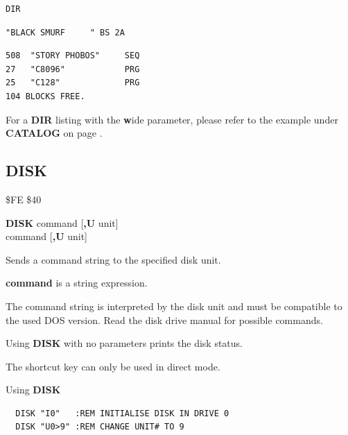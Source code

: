 \begin{description}[leftmargin=2cm,style=nextline]
\begin{tcolorbox}[colback=black,coltext=white]
\verbatimfont{\codefont}
\begin{verbatim}
DIR
\end{verbatim}
\selectfont{\codefont 0}
\begin{tcolorbox}[colback=white,coltext=black,arc=0mm,boxrule=0mm,
       left*=0.5mm,right*=0mm,top=0mm,bottom=0mm,nobeforeafter,
       left skip=0.5mm,
       width=28mm,height=3mm,valign=center]
\begin{verbatim}
"BLACK SMURF     " BS 2A
\end{verbatim}
\end{tcolorbox}
\begin{verbatim}
508  "STORY PHOBOS"     SEQ
27   "C8096"            PRG
25   "C128"             PRG
104 BLOCKS FREE.
\end{verbatim}
\end{tcolorbox}

For a {\bf DIR} listing with the {\bf w}ide parameter, please refer to the example under {\bf CATALOG}
on page \pageref{3columndirlisting}.

\end{description}


\newpage
\subsection{DISK}
\begin{description}[leftmargin=2cm,style=nextline]
\item [Token:] \$FE \$40
\item [Format:] {\bf DISK} command [{\bf,U} unit] \\
                 command [{\bf,U} unit]
\item [Usage:]

   Sends a command string to the specified disk unit.

   \unitdefinition

   {\bf command} is a string expression.

\item [Remarks:]
   The command string is interpreted by the disk unit
   and must be compatible to the used DOS version.
   Read the disk drive manual for possible commands.

   Using {\bf DISK} with no parameters prints the disk status.

   The shortcut key  can only be used in direct mode.

\item [Examples:] Using {\bf DISK}
\begin{tcolorbox}[colback=black,coltext=white]
\verbatimfont{\codefont}
\begin{verbatim}
  DISK "I0"   :REM INITIALISE DISK IN DRIVE 0
  DISK "U0>9" :REM CHANGE UNIT# TO 9
\end{verbatim}
\end{tcolorbox}
\end{description}

